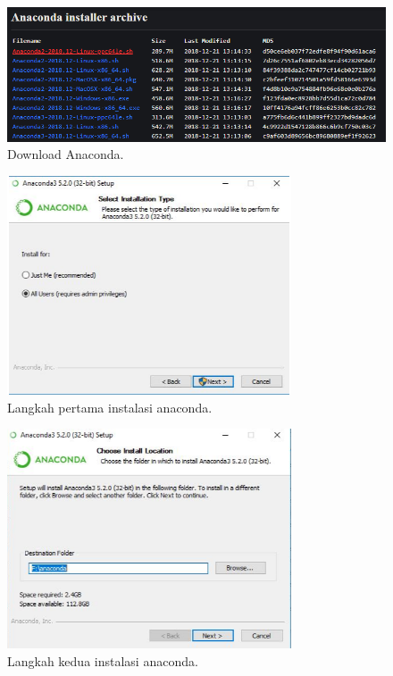 \begin{figure}[ht]\centerline{\includegraphics[width=1\textwidth]{figures/a1.PNG}}\caption{Download Anaconda.}\end{figure}
\begin{figure}[ht]\centerline{\includegraphics[width=0.75\textwidth]{figures/a2.PNG}}\caption{Langkah pertama instalasi anaconda.}\end{figure}
\begin{figure}[ht]\centerline{\includegraphics[width=0.75\textwidth]{figures/a3.PNG}}\caption{Langkah kedua instalasi anaconda.}\end{figure}
